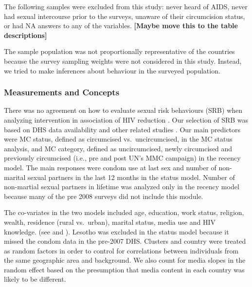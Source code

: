\documentclass[12pt,]{article}
\begin{document}
The following samples were excluded from this study: never heard of
AIDS, never had sexual intercourse prior to the surveys, unaware of
their circumcision status, or had NA answers to any of the variables.
\textbf{{[}Maybe move this to the table descriptions{]}}

The sample population was not proportionally representative of the
countries because the survey sampling weights were not considered in
this study. Instead, we tried to make inferences about behaviour in the
surveyed population.

\subsubsection{Measurements and
Concepts}\label{measurements-and-concepts}

There was no agreement on how to evaluate sexual risk behaviours (SRB)
when analyzing intervention in association of HIV reduction
\autocite{Unde13}. Our selection of SRB was based on DHS data
availability and other related studies
\autocites{AuveTalj05}{BailMose07}{GrayKigo07}{GrayKigo12}{KongSsek14}.
Our main predictors were MC status, defined as circumcised
vs.~uncircumcised, in the MC status analysis, and MC category, defined
as uncircumcised, newly circumcised and previously circumcised (i.e.,
pre and post UN's MMC campaign) in the recency model. The main responses
were condom use at last sex and number of non-marital sexual partners in
the last 12 months in the status model. Number of non-martial sexual
partners in lifetime was analyzed only in the recency model because many
of the pre 2008 surveys did not include this module.

The co-variates in the two models included age, education, work status,
religion, wealth, residence (rural vs.~urban), marital status, media use
and HIV knowledge. (see
\autocites{tab:Status_characteristics}{tab:Status_Sample_Characteristics}
and \autocite[
\textcite{tab:Recency_Sample_Characteristics}]{tab:Recency_characteristics}).
Lesotho was excluded in the status model because it missed the condom
data in the pre-2007 DHS. Clusters and country were treated as random
factors in order to control for correlations between individuals from
the same geographic area and background. We also count for media slopes
in the random effect based on the presumption that media content in each
country was likely to be different.
\end{document}
